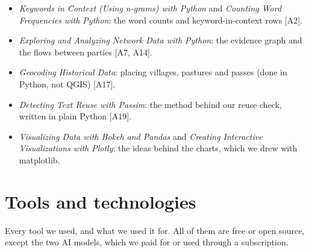 \documentclass[10pt,a4paper,twocolumn]{article}
\newcommand{\entry}[1]{{\small\sffamily\color{muted}[#1]}}
\begin{document}
\begin{itemize}
\item \emph{Keywords in Context (Using n-grams) with Python} and \emph{Counting Word Frequencies with Python}: the word counts and keyword-in-context rows \entry{A2}.
\item \emph{Exploring and Analyzing Network Data with Python}: the evidence graph and the flows between parties \entry{A7, A14}.
\item \emph{Geocoding Historical Data}: placing villages, pastures and passes (done in Python, not QGIS) \entry{A17}.
\item \emph{Detecting Text Reuse with Passim}: the method behind our reuse check, written in plain Python \entry{A19}.
\item \emph{Visualizing Data with Bokeh and Pandas} and \emph{Creating Interactive Visualizations with Plotly}: the ideas behind the charts, which we drew with matplotlib.
\end{itemize}


\clearpage
\section{Tools and technologies}

Every tool we used, and what we used it for. All of them are free or open source, except the two AI models, which we paid for or used through a subscription.
\end{document}
